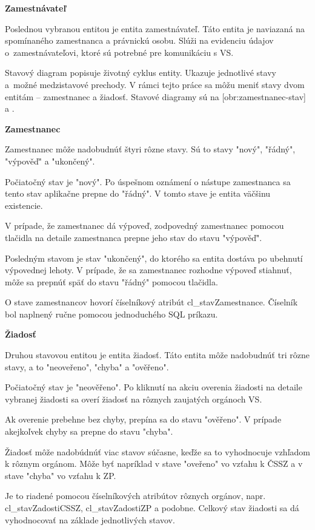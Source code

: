 \blank
\start
\setupindenting[no]
\start\bf Zamestnávateľ \stop
\stop

Poslednou vybranou entitou je entita zamestnávateľ. Táto entita je naviazaná na spomínaného zamestnanca a právnickú osobu. Slúži na evidenciu údajov o~zamestnávateľovi, ktoré sú potrebné pre komunikáciu s VS.

Stavový diagram popisuje životný cyklus entity. Ukazuje jednotlivé stavy a~možné medzistavové prechody. V rámci tejto práce sa môžu meniť stavy dvom entitám -- zamestnanec a žiadosť. Stavové diagramy sú na [obr:zamestnanec-stav] a .

\blank
\start
\setupindenting[no]
\start\bf Zamestnanec \stop
\stop

Zamestnanec môže nadobudnúť štyri rôzne stavy. Sú to stavy "nový", "řádný", "výpověď" a "ukončený".

Počiatočný stav je "nový". Po úspešnom oznámení o nástupe zamestnanca sa tento stav aplikačne prepne do "řádný". V tomto stave je entita väčšinu existencie. 

V prípade, že zamestnanec dá výpoveď, zodpovedný zamestnanec pomocou tlačidla na detaile zamestnanca prepne jeho stav do stavu "výpověď". 

Posledným stavom je stav "ukončený", do ktorého sa entita dostáva po ubehnutí výpovednej lehoty. V prípade, že sa zamestnanec rozhodne výpoveď stiahnuť, môže sa prepnúť späť do stavu "řádný" pomocou tlačidla. 

O stave zamestnancov hovorí číselníkový atribút cl_stavZamestnance. Číselník bol naplnený ručne pomocou jednoduchého SQL príkazu.

\blank
\start
\setupindenting[no]
\start\bf Žiadosť \stop
\stop

Druhou stavovou entitou je entita žiadosť. Táto entita môže nadobudnúť tri rôzne stavy, a to "neoveřeno", "chyba" a "ověřeno". 

Počiatočný stav je "neověřeno". Po kliknutí na akciu overenia žiadosti na detaile vybranej žiadosti sa overí žiadosť na rôznych zaujatých orgánoch VS. 

Ak overenie prebehne bez chyby, prepína sa do stavu "ověřeno". V prípade akejkoľvek chyby sa prepne do stavu "chyba". 

Žiadosť môže nadobúdnúť viac stavov súčasne, keďže sa to vyhodnocuje vzhľadom k rôznym orgánom. Môže byť napríklad v stave "oveřeno" vo vzťahu k ČSSZ a v stave "chyba" vo vzťahu k ZP. 

Je to riadené pomocou číselníkových atribútov rôznych orgánov, napr. cl_stavZadostiCSSZ, cl_stavZadostiZP a podobne. Celkový stav žiadosti sa dá vyhodnocovať na základe jednotlivých stavov. 


